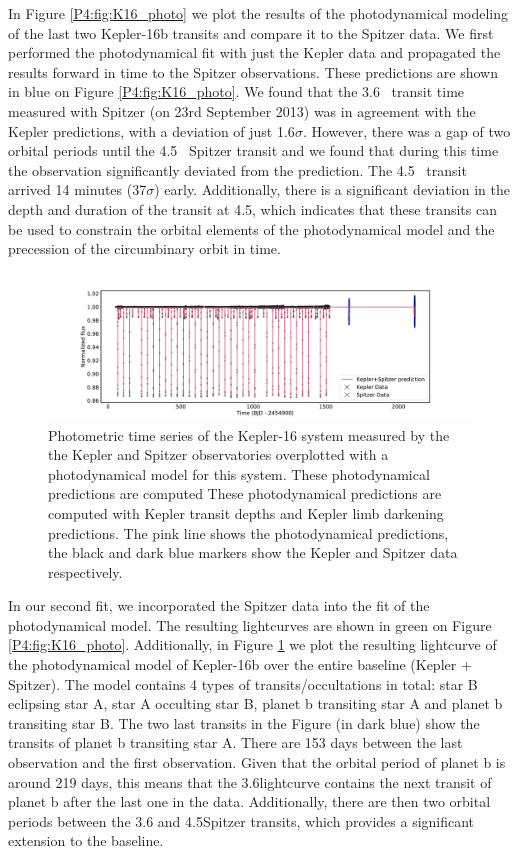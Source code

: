 In Figure \ref{P4:fig:K16_photo} we plot the results of the photodynamical modeling of the last two Kepler-16b transits and compare it to the Spitzer data.
We first performed the photodynamical fit with just the Kepler data and propagated the results forward in time to the Spitzer observations. These predictions are shown in blue on Figure \ref{P4:fig:K16_photo}. We found that the 3.6\um~ transit time measured with Spitzer (on 23rd September 2013) was in agreement with the Kepler predictions, with a deviation of just 1.6$\sigma$. However, there was a gap of two orbital periods until the 4.5\um~ Spitzer transit and we found that during this time the observation significantly deviated from the prediction. The 4.5\um~ transit arrived 14 minutes (37$\sigma$) early. Additionally, there is a significant deviation in the depth and duration of the transit at 4.5\um, which indicates that these transits can be used to constrain the orbital elements of the photodynamical model and the precession of the circumbinary orbit in time.

\begin{figure}
    \centering
    \includegraphics[trim={3cm 0 3cm 0},clip,width=\linewidth]{Kepler16b_photodynamicalmodel.pdf}
    \caption{Photometric time series of the Kepler-16 system measured by the the Kepler and Spitzer observatories overplotted with a photodynamical model for this system. These photodynamical predictions are computed These photodynamical predictions are computed with Kepler transit depths and Kepler limb darkening predictions. The pink line shows the photodynamical predictions, the black and dark blue markers show the Kepler and Spitzer data respectively.}
    \label{P4:fig:K16_model}
\end{figure}


In our second fit, we incorporated the Spitzer data into the fit of the photodynamical model. The resulting lightcurves are shown in green on Figure \ref{P4:fig:K16_photo}. Additionally, in Figure \ref{P4:fig:K16_model} we plot the resulting lightcurve of the photodynamical model of Kepler-16b over the entire baseline (Kepler + Spitzer). The model contains 4 types of transits/occultations in total: star B eclipsing star A, star A occulting star B, planet b transiting star A and planet b transiting star B. The two last transits in the Figure (in dark blue) show the \spitzer transits of planet b transiting star A. There are 153 days between the last \Kepler observation and the first \spitzer observation. Given that the orbital period of planet b is around 219 days, this means that the 3.6\um \spitzer lightcurve contains the next transit of planet b after the last one in the \Kepler data. Additionally, there are then two orbital periods between the 3.6 and 4.5\um Spitzer transits, which provides a significant extension to the baseline.

